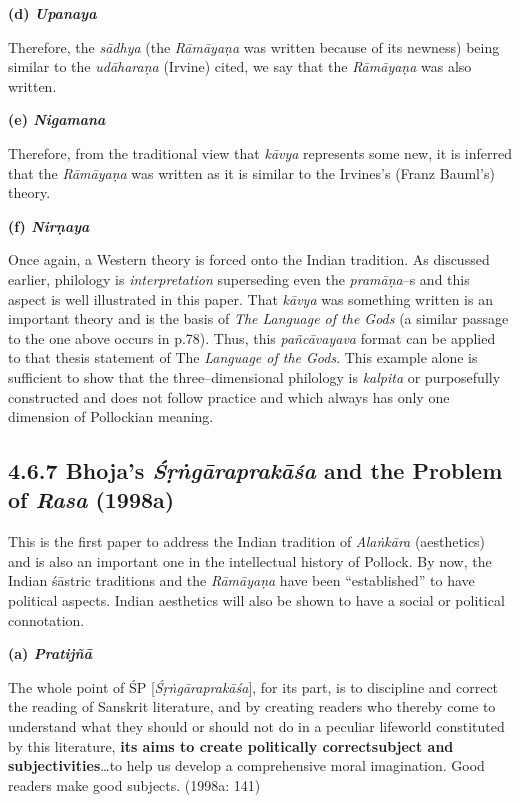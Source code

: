 \textbf{(d) \textit{Upanaya}}

Therefore, the \textit{sādhya} (the \textit{Rāmāyaṇa} was written because of its newness) being similar to the \textit{udāharaṇa} (Irvine) cited, we say that the \textit{Rāmāyaṇa} was also written.

\textbf{(e) \textit{Nigamana}}

Therefore, from the traditional view that \textit{kāvya} represents some new, it is inferred that the \textit{Rāmāyaṇa }was written as it is similar to the Irvines’s (Franz Bauml’s) theory.

\textbf{(f) \textit{Nirṇaya}}

Once again, a Western theory is forced onto the Indian tradition. As discussed earlier, philology is \textit{interpretation} superseding even the \textit{pramāṇa}–s and this aspect is well illustrated in this paper. That \textit{kāvya} was something written is an important theory and is the basis of \textit{The Language of the Gods} (a similar passage to the one above occurs in p.78). Thus, this \textit{pañcāvayava} format can be applied to that thesis statement of The\textit{ Language of the Gods}. This example alone is sufficient to show that the three–dimensional philology is \textit{kalpita} or purposefully constructed and does not follow practice and which always has only one dimension of Pollockian meaning.

\vspace{-.5cm}

\subsection*{4.6.7 Bhoja's {\it {\bfseries Śṛṅgāraprakāśa}} and the Problem of {\it {\bfseries Rasa}} (1998a)}

This is the first paper to address the Indian tradition of \textit{Alaṅkāra }(aesthetics) and is also an important one in the intellectual history of Pollock. By now, the Indian śāstric traditions and the \textit{Rāmāyaṇa} have been “established” to have political aspects. Indian aesthetics will also be shown to have a social or political connotation.


\textbf{(a) \textit{Pratijñā}}

\begin{myquote}
The whole point of ŚP [\textit{Śṛṅgāraprakāśa}], for its part, is to discipline and correct the reading of Sanskrit literature, and by creating readers who thereby come to understand what they should or should not do in a peculiar lifeworld constituted by this literature, \textbf{its aims to create politically correct}\textbf{subject and subjectivities}…to help us develop a comprehensive moral imagination. Good readers make good subjects. (1998a: 141)
\end{myquote}

